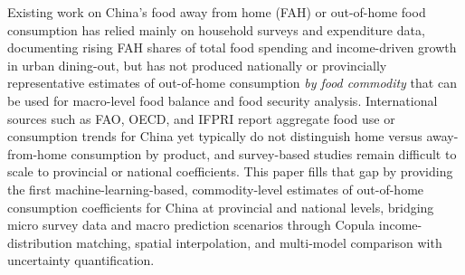 
Existing work on China's food away from home (FAH) or out-of-home food consumption has relied mainly on household surveys and expenditure data, documenting rising FAH shares of total food spending and income-driven growth in urban dining-out, but has not produced nationally or provincially representative estimates of out-of-home consumption \emph{by food commodity} that can be used for macro-level food balance and food security analysis. International sources such as FAO, OECD, and IFPRI report aggregate food use or consumption trends for China yet typically do not distinguish home versus away-from-home consumption by product, and survey-based studies remain difficult to scale to provincial or national coefficients. This paper fills that gap by providing the first machine-learning-based, commodity-level estimates of out-of-home consumption coefficients for China at provincial and national levels, bridging micro survey data and macro prediction scenarios through Copula income-distribution matching, spatial interpolation, and multi-model comparison with uncertainty quantification.
